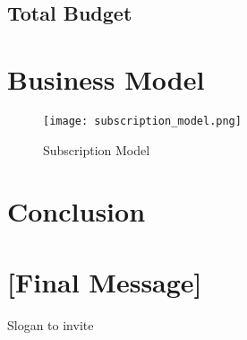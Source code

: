 \documentclass[11pt]{article}
\begin{document}
\subsection*{Total Budget}

\section{Business Model}


\begin{figure}[h]
    \centering
    \texttt{[image: subscription\_model.png]}
    \caption{Subscription Model}
    \label{fig:subscription_model}
\end{figure}


\section{Conclusion}

\section{[Final Message]}


\begin{center}
\Large{Slogan to invite}
\end{center}
\end{document}
